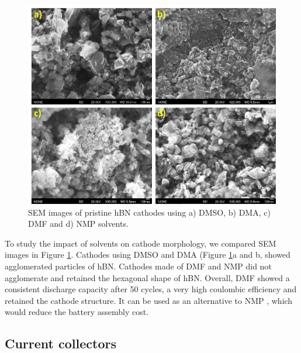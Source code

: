 \begin{figure}[tbh!]
\centering
\includegraphics[width=\textwidth]{Figures/chap7fig/hBNsolventSEM}
\caption{SEM images of pristine hBN cathodes using a) DMSO, b) DMA, c) DMF and d) NMP solvents.}
\label{Figures/chap7fig:hBNsolventSEM}
\end{figure}

To study the impact of solvents on cathode morphology, we compared SEM images in Figure \ref{Figures/chap7fig:hBNsolventSEM}. Cathodes using DMSO and DMA (Figure \ref{Figures/chap7fig:hBNsolventSEM}a and b, showed agglomerated particles of hBN. Cathodes made of DMF and NMP did not agglomerate and retained the hexagonal shape of hBN. Overall, DMF showed a consistent discharge capacity after 50 cycles, a very high coulombic efficiency and retained the cathode structure. It can be used as an alternative to NMP , which would reduce the battery assembly cost. 

\subsection*{Current collectors}

